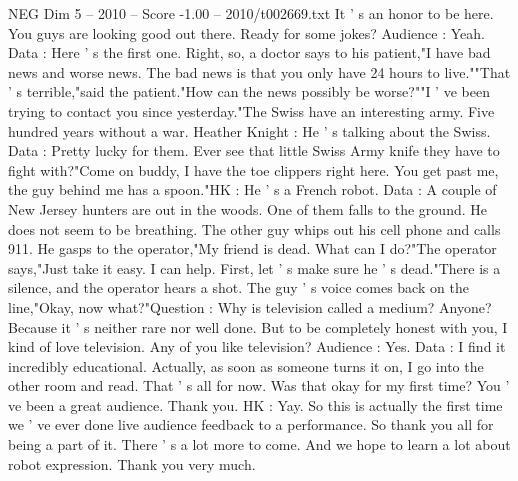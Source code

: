 \begin{textsample}{NEG Dim 5 – 2010 – Score -1.00 – 2010/t002669.txt}
It ' s an honor to be here.
You guys are looking good out there.
Ready for some jokes?
Audience : Yeah.
Data : Here ' s the first one.
Right, so, a doctor says to his patient,"I have bad news and worse news.
The bad news is that you only have 24 hours to live.""That ' s terrible,"said the patient."How can the news possibly be worse?""I ' ve been trying to contact you since yesterday."The Swiss have an interesting army.
Five hundred years without a war.
Heather Knight : He ' s talking about the Swiss.
Data : Pretty lucky for them.
Ever see that little Swiss Army knife they have to fight with?"Come on buddy, I have the toe clippers right here.
You get past me, the guy behind me has a spoon."HK : He ' s a French robot.
Data : A couple of New Jersey hunters are out in the woods.
One of them falls to the ground.
He does not seem to be breathing.
The other guy whips out his cell phone and calls 911.
He gasps to the operator,"My friend is dead.
What can I do?"The operator says,"Just take it easy.
I can help.
First, let ' s make sure he ' s dead."There is a silence, and the operator hears a shot.
The guy ' s voice comes back on the line,"Okay, now what?"Question : Why is television called a medium?
Anyone?
Because it ' s neither rare nor well done.
But to be completely honest with you, I kind of love television.
Any of you like television?
Audience : Yes.
Data : I find it incredibly educational.
Actually, as soon as someone turns it on, I go into the other room and read.
That ' s all for now.
Was that okay for my first time?
You ' ve been a great audience.
Thank you.
HK : Yay.
So this is actually the first time we ' ve ever done live audience feedback to a performance.
So thank you all for being a part of it.
There ' s a lot more to come.
And we hope to learn a lot about robot expression.
Thank you very much.

\end{textsample}
